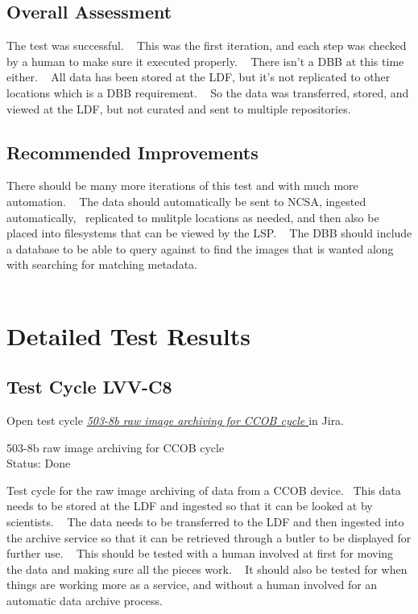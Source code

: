 \documentclass[DM,STR,toc]{lsstdoc}
\begin{document}
\subsection{Overall Assessment}
\label{sect:overallassessment}

The test was successful. ~ This was the first iteration, and each step
was checked by a human to make sure it executed properly. ~ There isn't
a DBB at this time either. ~ All data has been stored at the LDF, but
it's not replicated to other locations which is a DBB requirement. ~ So
the data was transferred, stored, and viewed at the LDF, but not curated
and sent to multiple repositories.~~


\subsection{Recommended Improvements}
\label{sect:recommendations}

There should be many more iterations of this test and with much more
automation. ~ The data should automatically be sent to NCSA, ingested
automatically, ~replicated to mulitple locations as needed, and then
also be placed into filesystems that can be viewed by the LSP. ~ The DBB
should include a database to be able to query against to find the images
that is wanted along with searching for matching metadata. ~\\
\hspace*{0.333em} ~


\newpage
\section{Detailed Test Results}
\label{sect:detailedtestresults}


  \subsection{Test Cycle LVV-C8 }

Open test cycle {\it \href{https://jira.lsstcorp.org/secure/Tests.jspa#/testrun/LVV-C8}{503-8b raw image archiving for CCOB cycle
}} in Jira.

  503-8b raw image archiving for CCOB cycle
\\
  Status: Done

  Test cycle for the raw image archiving of data from a CCOB device. ~This
data needs to be stored at the LDF and ingested so that it can be looked
at by scientists. ~ The data needs to be transferred to the LDF and then
ingested into the archive service so that it can be retrieved through a
butler to be displayed for further use. ~ This should be tested with a
human involved at first for moving the data and making sure all the
pieces work. ~ It should also be tested for when things are working more
as a service, and without a human involved for an automatic data archive
process.\\
~\\
\end{document}
